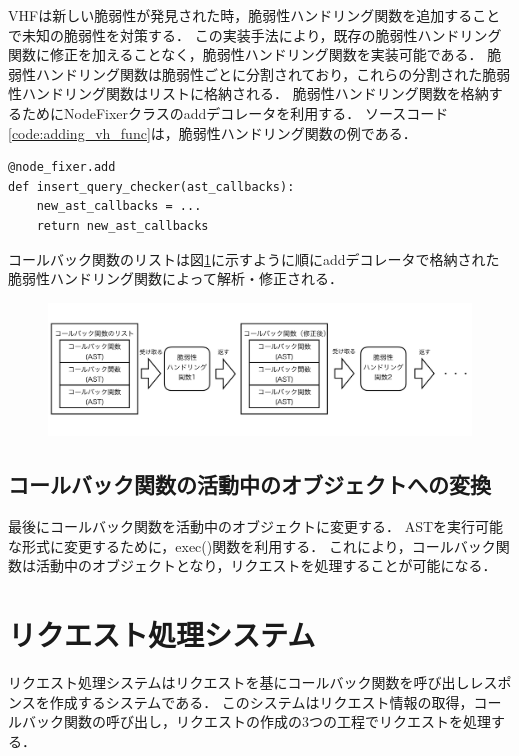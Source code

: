 \documentclass[a4paper,12pt]{jreport}
\begin{document}
VHFは新しい脆弱性が発見された時，脆弱性ハンドリング関数を追加することで未知の脆弱性を対策する．
この実装手法により，既存の脆弱性ハンドリング関数に修正を加えることなく，脆弱性ハンドリング関数を実装可能である．
脆弱性ハンドリング関数は脆弱性ごとに分割されており，これらの分割された脆弱性ハンドリング関数はリストに格納される．
脆弱性ハンドリング関数を格納するためにNodeFixerクラスのaddデコレータを利用する．
ソースコード\ref{code:adding_vh_func}は，脆弱性ハンドリング関数の例である．
\begin{lstlisting}[caption={脆弱性ハンドリング関数の例.}, label=code:adding_vh_func, captionpos=b]
@node_fixer.add
def insert_query_checker(ast_callbacks):
    new_ast_callbacks = ...
    return new_ast_callbacks
\end{lstlisting}
コールバック関数のリストは図\ref{fig:vh_funcs}に示すように順にaddデコレータで格納された脆弱性ハンドリング関数によって解析・修正される．
\begin{figure}[ht]
  \begin{center}
    \includegraphics[clip, width=130mm]{./figures/splited_vhfunction.png}
    \label{fig:vh_funcs}
  \end{center}
\end{figure}
\subsection{コールバック関数の活動中のオブジェクトへの変換}
最後にコールバック関数を活動中のオブジェクトに変更する．
ASTを実行可能な形式に変更するために，exec()関数を利用する．
これにより，コールバック関数は活動中のオブジェクトとなり，リクエストを処理することが可能になる．

\section{リクエスト処理システム}
リクエスト処理システムはリクエストを基にコールバック関数を呼び出しレスポンスを作成するシステムである．
このシステムはリクエスト情報の取得，コールバック関数の呼び出し，リクエストの作成の3つの工程でリクエストを処理する．
\end{document}

